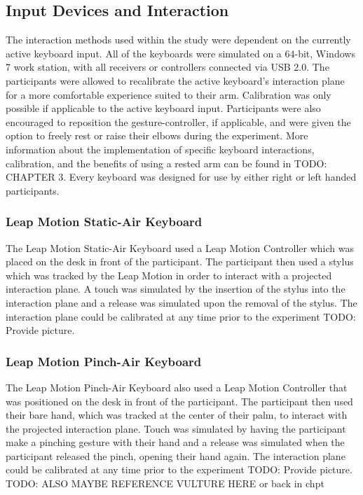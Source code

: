 \subsection{Input Devices and Interaction}
The interaction methods used within the study were dependent on the currently active keyboard input. All of the keyboards were simulated on a 64-bit, Windows 7 work station, with all receivers or controllers connected via USB 2.0. The participants were allowed to recalibrate the active keyboard's interaction plane for a more comfortable experience suited to their arm. Calibration was only possible if applicable to the active keyboard input. Participants were also encouraged to reposition the gesture-controller, if applicable, and were given the option to freely rest or raise their elbows during the experiment. More information about the implementation of specific keyboard interactions, calibration, and the benefits of using a rested arm can be found in TODO: CHAPTER 3. Every keyboard was designed for use by either right or left handed participants.

\subsubsection{Leap Motion Static-Air Keyboard}
The Leap Motion Static-Air Keyboard used a Leap Motion Controller which was placed on the desk in front of the participant. The participant then used a stylus which was tracked by the Leap Motion in order to interact with a projected interaction plane. A touch was simulated by the insertion of the stylus into the interaction plane and a release was simulated upon the removal of the stylus. The interaction plane could be calibrated at any time prior to the experiment TODO: Provide picture.

\subsubsection{Leap Motion Pinch-Air Keyboard}
The Leap Motion Pinch-Air Keyboard also used a Leap Motion Controller that was positioned on the desk in front of the participant. The participant then used their bare hand, which was tracked at the center of their palm, to interact with the projected interaction plane. Touch was simulated by having the participant make a pinching gesture with their hand and a release was simulated when the participant released the pinch, opening their hand again. The interaction plane could be calibrated at any time prior to the experiment TODO: Provide picture. TODO: ALSO MAYBE REFERENCE VULTURE HERE or back in chpt

